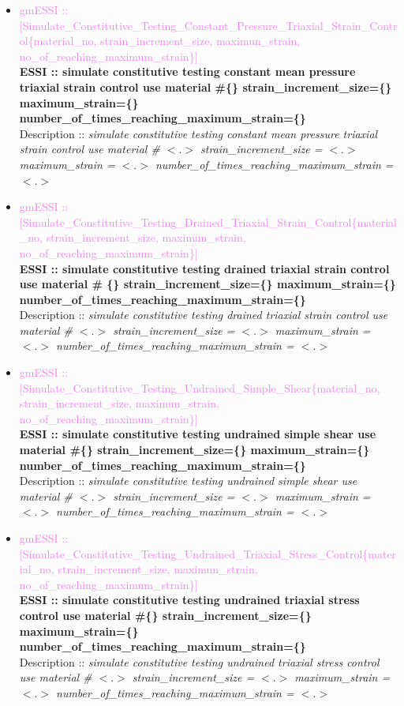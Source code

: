 \documentclass[11pt]{article}
\begin{document}
\begin{itemize}
      \item \textcolor{violet} {gmESSI :: [Simulate\_Constitutive\_Testing\_Constant\_Pressure\_Triaxial\_Strain\_Control\{material\_no, strain\_increment\_size, maximun\_strain, no\_of\_reaching\_maximum\_strain\}]}\\
      \textbf{ESSI :: simulate constitutive testing constant mean pressure triaxial strain control use material \#\{\} strain\_increment\_size=\{\} maximum\_strain=\{\} number\_of\_times\_reaching\_maximum\_strain=\{\} }\\
      Description :: \textit{simulate constitutive testing constant mean pressure triaxial strain control use material \# $<.>$ strain\_increment\_size = $<.>$ maximum\_strain = $<.>$ number\_of\_times\_reaching\_maximum\_strain = $<.>$}

      \item \textcolor{violet} {gmESSI :: [Simulate\_Constitutive\_Testing\_Drained\_Triaxial\_Strain\_Control\{material\_no, strain\_increment\_size, maximun\_strain, no\_of\_reaching\_maximum\_strain\}]}\\
      \textbf{ESSI :: simulate constitutive testing drained triaxial strain control use material \# \{\} strain\_increment\_size=\{\} maximum\_strain=\{\} number\_of\_times\_reaching\_maximum\_strain=\{\}}\\
      Description :: \textit{simulate constitutive testing drained triaxial strain control use material \# $<.>$ strain\_increment\_size = $<.>$ maximum\_strain = $<.>$ number\_of\_times\_reaching\_maximum\_strain = $<.>$}

      \item \textcolor{violet} {gmESSI :: [Simulate\_Constitutive\_Testing\_Undrained\_Simple\_Shear\{material\_no, strain\_increment\_size, maximun\_strain, no\_of\_reaching\_maximum\_strain\}]}\\
      \textbf{ESSI :: simulate constitutive testing undrained simple shear use material \#\{\} strain\_increment\_size=\{\} maximum\_strain=\{\} number\_of\_times\_reaching\_maximum\_strain=\{\}}\\
      Description :: \textit{simulate constitutive testing undrained simple shear use material \# $<.>$ strain\_increment\_size = $<.>$ maximum\_strain = $<.>$ number\_of\_times\_reaching\_maximum\_strain = $<.>$}

      \item \textcolor{violet} {gmESSI :: [Simulate\_Constitutive\_Testing\_Undrained\_Triaxial\_Stress\_Control\{material\_no, strain\_increment\_size, maximun\_strain, no\_of\_reaching\_maximum\_strain\}]}\\
      \textbf{ESSI :: simulate constitutive testing undrained triaxial stress control use material \#\{\} strain\_increment\_size=\{\} maximum\_strain=\{\} number\_of\_times\_reaching\_maximum\_strain=\{\}}\\
      Description :: \textit{simulate constitutive testing undrained triaxial stress control use material \# $<.>$ strain\_increment\_size = $<.>$ maximum\_strain = $<.>$ number\_of\_times\_reaching\_maximum\_strain = $<.>$}


\end{itemize}
\end{document}
